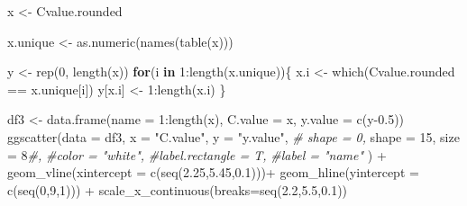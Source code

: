 \documentclass[
]{book}
\newenvironment{Shaded}{\begin{snugshade}}{\end{snugshade}}
\newcommand{\AttributeTok}[1]{\textcolor[rgb]{0.77,0.63,0.00}{#1}}
\newcommand{\CommentTok}[1]{\textcolor[rgb]{0.56,0.35,0.01}{\textit{#1}}}
\newcommand{\ControlFlowTok}[1]{\textcolor[rgb]{0.13,0.29,0.53}{\textbf{#1}}}
\newcommand{\DecValTok}[1]{\textcolor[rgb]{0.00,0.00,0.81}{#1}}
\newcommand{\FloatTok}[1]{\textcolor[rgb]{0.00,0.00,0.81}{#1}}
\newcommand{\FunctionTok}[1]{\textcolor[rgb]{0.00,0.00,0.00}{#1}}
\newcommand{\NormalTok}[1]{#1}
\newcommand{\OtherTok}[1]{\textcolor[rgb]{0.56,0.35,0.01}{#1}}
\newcommand{\SpecialCharTok}[1]{\textcolor[rgb]{0.00,0.00,0.00}{#1}}
\newcommand{\StringTok}[1]{\textcolor[rgb]{0.31,0.60,0.02}{#1}}
\begin{document}
\begin{Shaded}
\begin{Highlighting}[]
\NormalTok{x }\OtherTok{\textless{}{-}}\NormalTok{ Cvalue.rounded}

\NormalTok{x.unique }\OtherTok{\textless{}{-}} \FunctionTok{as.numeric}\NormalTok{(}\FunctionTok{names}\NormalTok{(}\FunctionTok{table}\NormalTok{(x)))}

\NormalTok{y }\OtherTok{\textless{}{-}} \FunctionTok{rep}\NormalTok{(}\DecValTok{0}\NormalTok{, }\FunctionTok{length}\NormalTok{(x))}
\ControlFlowTok{for}\NormalTok{(i }\ControlFlowTok{in} \DecValTok{1}\SpecialCharTok{:}\FunctionTok{length}\NormalTok{(x.unique))\{}
\NormalTok{  x.i }\OtherTok{\textless{}{-}} \FunctionTok{which}\NormalTok{(Cvalue.rounded }\SpecialCharTok{==}\NormalTok{ x.unique[i])}
\NormalTok{  y[x.i] }\OtherTok{\textless{}{-}} \DecValTok{1}\SpecialCharTok{:}\FunctionTok{length}\NormalTok{(x.i)}
\NormalTok{\}}

\NormalTok{df3 }\OtherTok{\textless{}{-}} \FunctionTok{data.frame}\NormalTok{(}\AttributeTok{name =} \DecValTok{1}\SpecialCharTok{:}\FunctionTok{length}\NormalTok{(x),}
                    \AttributeTok{C.value =}\NormalTok{ x,}
                  \AttributeTok{y.value =} \FunctionTok{c}\NormalTok{(y}\FloatTok{{-}0.5}\NormalTok{))}
\FunctionTok{ggscatter}\NormalTok{(}\AttributeTok{data =}\NormalTok{ df3,}
          \AttributeTok{x =} \StringTok{"C.value"}\NormalTok{,}
          \AttributeTok{y =} \StringTok{"y.value"}\NormalTok{,}
         \CommentTok{\# shape = 0,}
         \AttributeTok{shape =} \DecValTok{15}\NormalTok{,}
          \AttributeTok{size =} \DecValTok{8}\CommentTok{\#,}
          \CommentTok{\#color = "white",}
          \CommentTok{\#label.rectangle = T,}
          \CommentTok{\#label = "name" }
\NormalTok{          ) }\SpecialCharTok{+}
\FunctionTok{geom\_vline}\NormalTok{(}\AttributeTok{xintercept =} \FunctionTok{c}\NormalTok{(}\FunctionTok{seq}\NormalTok{(}\FloatTok{2.25}\NormalTok{,}\FloatTok{5.45}\NormalTok{,}\FloatTok{0.1}\NormalTok{)))}\SpecialCharTok{+}
  \FunctionTok{geom\_hline}\NormalTok{(}\AttributeTok{yintercept =} \FunctionTok{c}\NormalTok{(}\FunctionTok{seq}\NormalTok{(}\DecValTok{0}\NormalTok{,}\DecValTok{9}\NormalTok{,}\DecValTok{1}\NormalTok{))) }\SpecialCharTok{+}
  \FunctionTok{scale\_x\_continuous}\NormalTok{(}\AttributeTok{breaks=}\FunctionTok{seq}\NormalTok{(}\FloatTok{2.2}\NormalTok{,}\FloatTok{5.5}\NormalTok{,}\FloatTok{0.1}\NormalTok{))}
\end{Highlighting}
\end{Shaded}
\end{document}
